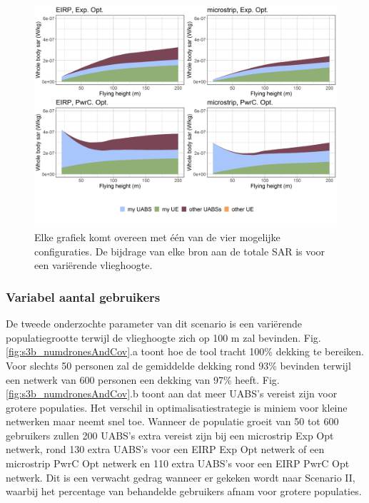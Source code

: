 \documentclass[twocolumn]{phdsymp_dutch}
\begin{document}
\begin{figure}[h!]
  \includegraphics[width=\linewidth]{../results/s3/fhFourSources.png}
  \caption{Elke grafiek komt overeen met \'e\'en van de vier mogelijke configuraties.
   De bijdrage van elke bron aan de totale \acs{SAR} is voor een variërende vlieghoogte.}
  \label{fig:s3a_fourSourcesMatrix}
\end{figure}

\FloatBarrier
\subsubsection{Variabel aantal gebruikers}
De tweede onderzochte parameter van dit scenario is een vari\"erende populatiegrootte
terwijl de vlieghoogte zich op 100 m zal bevinden.
Fig.  \ref{fig:s3b_numdronesAndCov}.a toont hoe de tool tracht 100\% dekking te bereiken.
Voor slechts 50 personen zal de gemiddelde dekking
 rond 93\% bevinden terwijl een netwerk van 600 personen een dekking van 97\% heeft.
Fig. \ref{fig:s3b_numdronesAndCov}.b toont aan dat meer \gls{UABS}'s  vereist zijn voor grotere populaties.
Het verschil in optimalisatiestrategie is miniem voor kleine netwerken maar neemt snel toe. 
Wanneer de populatie groeit van 50 tot 600 gebruikers zullen 200 \gls{UABS}'s extra vereist zijn bij een
 microstrip \gls{Exp Opt} netwerk,
 rond 130 extra \gls{UABS}'s voor een \gls{EIRP} \gls{Exp Opt} netwerk of een microstrip \gls{PwrC Opt} netwerk
 en 110 extra \gls{UABS}'s voor een \gls{EIRP} \gls{PwrC Opt} netwerk.
Dit is een verwacht gedrag wanneer er gekeken wordt naar Scenario II,
waarbij het percentage van behandelde gebruikers afnam voor grotere populaties.
\end{document}
